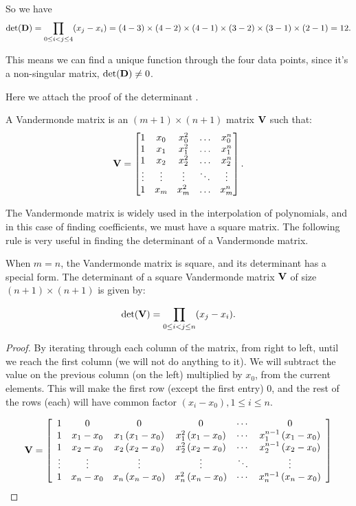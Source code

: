 \documentclass[12pt,a4paper]{article}
\begin{document}
\begin{solution}
So we have 
\[
\det(\mathbf{D}) = \prod_{0 \leq i < j \leq 4} (x_j - x_i) = (4-3) \times (4-2) \times (4-1) \times (3-2) \times (3-1) \times (2-1) = 12.
\]

This means we can find a unique function through the four data points, since it's a non-singular matrix, \(\det(\mathbf{D}) \neq 0\).

\begin{remark}
Here we attach the proof of the determinant \parencite{kalman_generalized_1984, rushanan_vandermonde_1989}.
\begin{definition}
    A Vandermonde matrix is an \((m+1) \times (n+1)\) matrix \(\mathbf{V}\) such that:
    $$
    \mathbf{V}=
    \begin{bmatrix}
    1 & x_0 & x_0^2 & \ldots & x_0^n \\
    1 & x_1 & x_1^2 & \ldots & x_1^n \\
    1 & x_2 & x_2^2 & \ldots & x_2^n \\
    \vdots & \vdots & \vdots & \ddots & \vdots \\
    1 & x_m & x_m^2 & \ldots & x_m^n
    \end{bmatrix}.
    $$
\end{definition}
The Vandermonde matrix is widely used in the interpolation of polynomials, and in this case of finding coefficients, we must have a square matrix. The following rule is very useful in finding the determinant of a Vandermonde matrix.
\begin{corollary}
    When \(m = n\), the Vandermonde matrix is square, and its determinant has a special form. The determinant of a square Vandermonde matrix \(\mathbf{V}\) of size \((n+1) \times (n+1)\) is given by:

\[
\det(\mathbf{V}) = \prod_{0 \leq i < j \leq n} (x_j - x_i).
\]
\end{corollary}
\begin{proof}
By iterating through each column of the matrix, from right to left, until we reach the first column (we will not do anything to it). We will subtract the value on the previous column (on the left) multiplied by \(x_0\), from the current elements. This will make the first row (except the first entry) 0, and the rest of the rows (each) will have common factor \((x_i - x_0), 1 \leq i \leq n\).

$$
\mathbf{V}=\left[\begin{array}{cccccc}
1 & 0 & 0 & 0 & \cdots & 0 \\
1 & x_1-x_0 & x_1\left(x_1-x_0\right) & x_1^2\left(x_1-x_0\right) & \cdots & x_1^{n-1}\left(x_1-x_0\right) \\
1 & x_2-x_0 & x_2\left(x_2-x_0\right) & x_2^2\left(x_2-x_0\right) & \cdots & x_2^{n-1}\left(x_2-x_0\right) \\
\vdots & \vdots & \vdots & \vdots & \ddots & \vdots \\
1 & x_n-x_0 & x_n\left(x_n-x_0\right) & x_n^2\left(x_n-x_0\right) & \cdots & x_n^{n-1}\left(x_n-x_0\right)
\end{array}\right]
$$


\end{proof}
\end{remark}
\end{solution}
\end{document}
